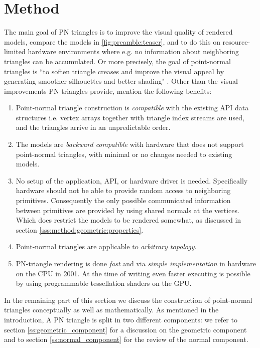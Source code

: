 
\section{Method}
\label{s:method}

The main goal of PN triangles is to improve the visual quality of rendered models, compare the models in \cref{fig:preamble:teaser}, and to do this on resource-limited hardware environments where e.g. no information about neighboring triangles can be accumulated. Or more precisely, the goal of point-normal triangles is ``to soften triangle creases and improve the visual appeal by generating smoother silhouettes and better shading" \cite{vlachos2001curved}. Other than the visual improvements PN triangles provide, \citeauthor{vlachos2001curved} mention the following benefits:

\begin{enumerate}
 	\item 
 		Point-normal triangle construction is \textit{compatible} with the existing API data structures i.e. vertex arrays together with triangle index streams are used, and the triangles arrive in an unpredictable order.
 	\item 
 		The models are \textit{backward compatible} with hardware that does not support point-normal triangles, with minimal or no changes needed to existing models.
 	\item 
 		No setup of the application, API, or hardware driver is needed. Specifically hardware should not be able to provide random access to neighboring primitives. Consequently the only possible communicated information between primitives are provided by using shared normals at the vertices. Which does restrict the models to be rendered somewhat, as discussed in section \ref{sss:method:geometric:properties}.
 	\item 
 		Point-normal triangles are applicable to \textit{arbitrary topology}.
 	\item 
 		PN-triangle rendering is done \textit{fast} and via \textit{simple implementation} in hardware on the CPU in 2001. At the time of writing even faster executing is possible by using programmable tessellation shaders on the GPU.
 \end{enumerate} 

In the remaining part of this section we discuss the construction of point-normal triangles conceptually as well as mathematically. As mentioned in the introduction, A PN triangle is split in two different components: we refer to section \ref{ss:geometric_component} for a discussion on the geometric component and to section \ref{ss:normal_component} for the review of the normal component.

